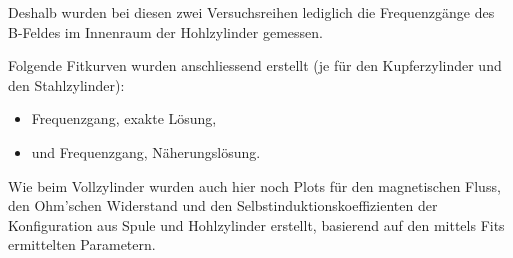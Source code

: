 Deshalb wurden  bei diesen  zwei Versuchsreihen lediglich  die Frequenzg\"ange
des B-Feldes im Innenraum der Hohlzylinder gemessen.

Folgende Fitkurven wurden anschliessend  erstellt (je f\"ur den Kupferzylinder
und den Stahlzylinder):
\begin{itemize}
    \item
        Frequenzgang, exakte L\"osung,
    \item
        und Frequenzgang, N\"aherungsl\"osung.
\end{itemize}

Wie  beim Vollzylinder  wurden auch  hier  noch Plots  f\"ur den  magnetischen
Fluss,  den Ohm'schen  Widerstand  und  den Selbstinduktionskoeffizienten  der
Konfiguration aus Spule  und Hohlzylinder erstellt, basierend  auf den mittels
Fits ermittelten Parametern.


